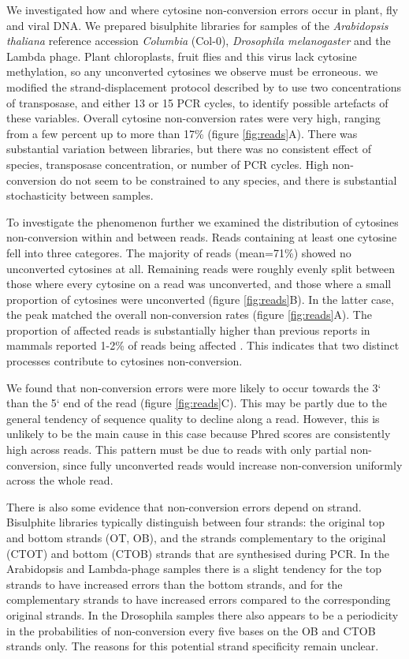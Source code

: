 \documentclass[12pt,longbibliography]{article}
\begin{document}
We investigated how and where cytosine non-conversion errors occur in plant, fly and viral DNA.
We prepared bisulphite libraries for samples of the \textit{Arabidopsis thaliana} reference accession \textit{Columbia} (Col-0), \textit{Drosophila melanogaster} and the Lambda phage.
Plant chloroplasts, fruit flies and this virus lack cytosine methylation, so any unconverted cytosines we observe must be erroneous.
we modified the strand-displacement protocol described by \textcite{weichenhan2018tagmentation} to use two concentrations of transposase, and either 13 or 15 PCR cycles, to identify possible artefacts of these variables.
Overall cytosine non-conversion rates were very high, ranging from a few percent up to more than 17\% (figure \ref{fig:reads}A).
There was substantial variation between libraries, but there was no consistent effect of species, transposase concentration, or number of PCR cycles.
High non-conversion do not seem to be constrained to any species, and there is substantial stochasticity between samples.

To investigate the phenomenon further we examined the distribution of cytosines non-conversion within and between reads.
Reads containing at least one cytosine fell into three categores.
The majority of reads (mean=71\%) showed no unconverted cytosines at all.
Remaining reads were roughly evenly split between those where every cytosine on a read was unconverted, and those where a small proportion of cytosines were unconverted (figure \ref{fig:reads}B).
In the latter case, the peak matched the overall non-conversion rates (figure \ref{fig:reads}A).
The proportion of affected reads is substantially higher than previous reports in mammals reported 1-2\% of reads being affected \parencite{lu2015improved, suzuki2018whole}.
This indicates that two distinct processes contribute to cytosines non-conversion.

We found that non-conversion errors were more likely to occur towards the 3` than the 5` end of the read (figure \ref{fig:reads}C).
This may be partly due to the general tendency of sequence quality to decline along a read.
However, this is unlikely to be the main cause in this case because Phred scores are consistently high across reads.
This pattern must be due to reads with only partial non-conversion, since fully unconverted reads would increase non-conversion uniformly across the whole read.

There is also some evidence that non-conversion errors depend on strand.
Bisulphite libraries typically distinguish between four strands: the original top and bottom strands (OT, OB), and the strands complementary to the original (CTOT) and bottom (CTOB) strands that are synthesised during PCR.
In the Arabidopsis and Lambda-phage samples there is a slight tendency for the top strands to have increased errors than the bottom strands, and for the complementary strands to have increased errors compared to the corresponding original strands.
In the Drosophila samples there also appears to be a periodicity in the probabilities of non-conversion every five bases on the OB and CTOB strands only.
The reasons for this potential strand specificity remain unclear.
\end{document}
